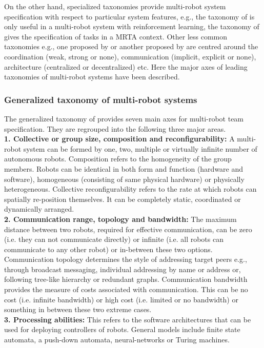 On the other hand, specialized taxonomies provide multi-robot system specification with respect to particular system features, e.g., the taxonomy of  is only useful in a multi-robot system with reinforcement learning, the taxonomy of  gives the specification of tasks in a MRTA context. Other less common taxonomies e.g., one proposed by  or another proposed by  are centred around the coordination (weak, strong or none), communication (implicit, explicit or none), architecture (centralized or decentralized) etc. Here the major axes of leading taxonomies of multi-robot systems have been described.
\subsubsection*{Generalized taxonomy of multi-robot systems}
The generalized taxonomy of  provides seven main axes for multi-robot team specification.  They are  regrouped into the following three major areas.\\
\textbf{1. Collective or group size, composition and reconfigurability: }  A multi-robot system can be formed by one, two, multiple or virtually infinite number of autonomous robots. Composition refers to the homogeneity of the group members. Robots can be identical in both form and function (hardware and software), homogeneous (consisting of same physical hardware) or physically heterogeneous. Collective reconfigurability refers to the rate at which robots can spatially re-position themselves. It can be completely static, coordinated or dynamically arranged.\\
\textbf{2. Communication range, topology and bandwidth: } The maximum distance between two robots, required for effective communication, can be zero (i.e. they can not communicate directly) or infinite (i.e. all robots can communicate to any other robot) or in-between these two options. Communication topology determines the style of addressing target peers e.g., through broadcast messaging, individual addressing by name or address or, following tree-like hierarchy or redundant graphs. Communication bandwidth provides the measure of costs associated with communication. This can be no cost (i.e. infinite bandwidth) or high cost (i.e. limited or no bandwidth) or something in between these two extreme cases.\\
\textbf{3. Processing abilities: } This refers to the software architectures that can be used for deploying controllers of robots. General models include finite state automata, a push-down automata, neural-networks or Turing machines. 
